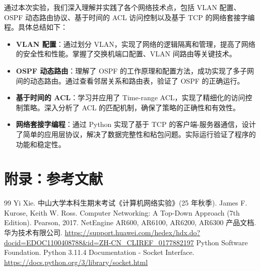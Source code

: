 \documentclass[a4paper]{article}
\begin{document}
通过本次实验，我们深入理解并实践了各个网络技术点，包括 VLAN 配置、OSPF 动态路由协议、基于时间的 ACL 访问控制以及基于 TCP 的网络套接字编程。具体总结如下：

\begin{itemize}
    \item \textbf{VLAN 配置}：通过划分 VLAN，实现了网络的逻辑隔离和管理，提高了网络的安全性和性能。掌握了交换机端口配置、VLAN 间路由等关键技术。
    
    \item \textbf{OSPF 动态路由}：理解了 OSPF 的工作原理和配置方法，成功实现了多子网间的动态路由。通过查看邻居关系和路由表，验证了 OSPF 的正确运行。
    
    \item \textbf{基于时间的 ACL}：学习并应用了 Time-range ACL，实现了精细化的访问控制策略。深入分析了 ACL 的匹配机制，确保了策略的正确性和有效性。
    
    \item \textbf{网络套接字编程}：通过 Python 实现了基于 TCP 的客户端-服务器通信，设计了简单的应用层协议，解决了数据完整性和粘包问题。实际运行验证了程序的功能和稳定性。
\end{itemize}


\appendix
\section{附录：参考文献}

\begin{thebibliography}{99}
 Yi Xie. 中山大学本科生期末考试《计算机网络实验》(25 年秋季).
 James F. Kurose, Keith W. Ross. Computer Networking: A Top-Down Approach (7th Edition). Pearson, 2017.
 NetEngine AR600, AR6100, AR6200, AR6300 产品文档. 华为技术有限公司. \url{https://support.huawei.com/hedex/hdx.do?docid=EDOC1100408788&id=ZH-CN_CLIREF_0177882197}
 Python Software Foundation. Python 3.11.4 Documentation - Socket Interface. \url{https://docs.python.org/3/library/socket.html}
\end{thebibliography}

\end{document}
